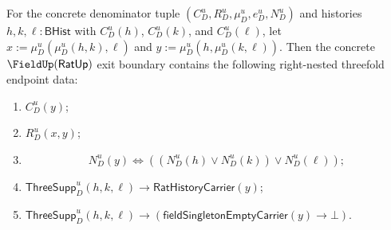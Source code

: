 \begin{theorem}
\label{thm:ratup-fieldup-right-nested-threefold-support-non-singleton-exactness}
For the concrete denominator tuple $(C_D^u,R_D^u,\mu_D^u,e_D^u,N_D^u)$ and
histories $h,k,\ell:\mathsf{BHist}$ with $C_D^u(h)$, $C_D^u(k)$, and
$C_D^u(\ell)$, let $x:=\mu_D^u(\mu_D^u(h,k),\ell)$ and
$y:=\mu_D^u(h,\mu_D^u(k,\ell))$. Then the concrete
$\FieldUp(\mathsf{RatUp})$ exit boundary contains the following right-nested
threefold endpoint data:
\begin{enumerate}
  \item $C_D^u(y)$;
  \item $R_D^u(x,y)$;
  \item
  $$
  N_D^u(y)
  \Longleftrightarrow
  ((N_D^u(h)\lor N_D^u(k))\lor N_D^u(\ell));
  $$
  \item $\mathsf{ThreeSupp}_D^u(h,k,\ell)\to\mathsf{RatHistoryCarrier}(y)$;
  \item
  $\mathsf{ThreeSupp}_D^u(h,k,\ell)\to
  (\mathsf{fieldSingletonEmptyCarrier}(y)\to\bot)$.
\end{enumerate}
\end{theorem}

